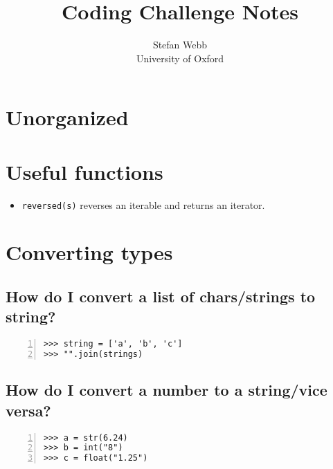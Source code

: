 \documentclass[12pt]{article}
\title{Coding Challenge Notes}
\author{
  Stefan Webb \\
  University of Oxford \\
}
\begin{document}
\lstset{language=Python,xleftmargin=12pt,basicstyle=\ttfamily\footnotesize,belowskip=0pt,tabsize=2,breaklines=true}
\newcommand{\python}[1]{\lstinline[columns=fixed]{#1}}

\suppressfloats

\setlength{\abovedisplayskip}{3.5pt}
\setlength{\belowdisplayskip}{3.5pt}
\setlength{\abovedisplayshortskip}{3.5pt}
\setlength{\belowdisplayshortskip}{3.5pt}	

\maketitle

%  

\section{Unorganized}

\section{Useful functions}
\begin{itemize}
  \item \python{reversed(s)} reverses an iterable and returns an iterator.
\end{itemize}

\section{Converting types}
\subsection{How do I convert a list of chars/strings to string?}
\begin{lstlisting}[numbers=left]
>>> string = ['a', 'b', 'c']
>>> "".join(strings)
\end{lstlisting}

\subsection{How do I convert a number to a string/vice versa?}
\begin{lstlisting}[numbers=left]
>>> a = str(6.24)
>>> b = int("8")
>>> c = float("1.25")
\end{lstlisting}
\end{document}
